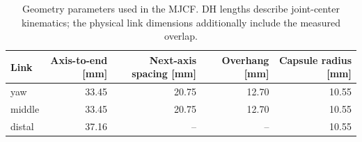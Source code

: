 \begin{table}[t]
  \centering
  \caption{Geometry parameters used in the MJCF. DH lengths describe joint-center
  kinematics; the physical link dimensions additionally include the measured overlap.}
  \label{tab:finger-geometry}
  \begin{tabular}{@{}lrrrr@{}}
    \toprule
    Link & Axis-to-end [mm] & Next-axis spacing [mm] & Overhang [mm] & Capsule radius [mm] \\
    \midrule
    yaw    & 33.45 & 20.75 & 12.70 & 10.55 \\
    middle & 33.45 & 20.75 & 12.70 & 10.55 \\
    distal & 37.16 & --    & --    & 10.55 \\
    \bottomrule
  \end{tabular}
\end{table}
